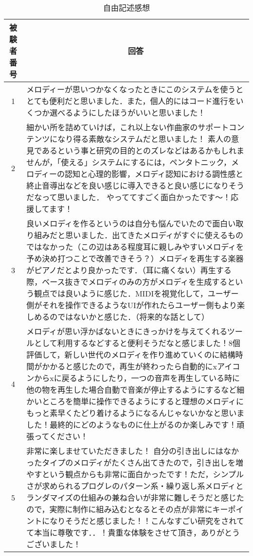 \begin{table}[htbp]
  \begin{center}
    \caption{自由記述感想}
    \begin{tabular}{|c|p{30em}|}
      \hline
      被験者番号 & \multicolumn{1}{c|}{回答}\rule[-3mm]{-1.3mm}{8mm} \\ \hline \hline
      1 & メロディーが思いつかなくなったときにこのシステムを使うととても便利だと思いました．また，個人的にはコード進行をいくつか選べるようにしたほうがいいと思いました！ \\ \hline
      2 & 細かい所を詰めていけば，これ以上ない作曲家のサポートコンテンツになり得る素敵なシステムだと思いました！
      素人の意見であるという事と研究の目的とのズレなどはあるかもしれませんが，「使える」システムにするには，ペンタトニック，メロディーの認知と心理的影響，メロディ認知における調性感と終止音導出などを良い感じに導入できると良い感じになりそうだなって思いました．
      やっててすごく面白かったです～！応援してます！ \\ \hline
      3 & 良いメロディを作るというのは自分も悩んでいたので面白い取り組みだと思いました．出てきたメロディがすぐに使えるものではなかった（この辺はある程度耳に親しみやすいメロディを予め決め打つことで改善できそう？）メロディを再生する楽器がピアノだとより良かったです．（耳に痛くない）再生する際，ベース抜きでメロディのみの方がメロディを生成するという観点では良いように感じた．MIDIを視覚化して，ユーザー側がそれを操作できるようなUIが作れたらユーザー側もより楽しめるのではないかと感じた．（将来的な話として） \\ \hline
      4 & メロディが思い浮かばないときにきっかけを与えてくれるツールとして利用するなどすると便利そうだなと感じました！8個評価して，新しい世代のメロディを作り進めていくのに結構時間がかかると感じたので，再生が終わったら自動的にxアイコンからxに戻るようにしたり，一つの音声を再生している時に他の物を再生した場合自動で音楽が停止するようにするなど細かいところを簡単に操作できるようにすると理想のメロディにもっと素早くたどり着けるようになるんじゃないかなと思いました！最終的にどのようなものに仕上がるのか楽しみです！頑張ってください！ \\ \hline
      5 & 非常に楽しませていただきました！
      自分の引き出しにはなかったタイプのメロディがたくさん出てきたので，引き出しを増やすという観点からも非常に面白かったです！ただ，シンプルさが求められるプログレのパターン系・繰り返し系メロディとランダマイズの仕組みの兼ね合いが非常に難しそうだと感じたので，実際に制作に組み込むとなるとその点が非常にキーポイントになりそうだと感じました！！こんなすごい研究をされてて本当に尊敬です．．！貴重な体験をさせて頂き，ありがとうございました！ \\ \hline

\end{tabular}
\end{center}
\end{table}
